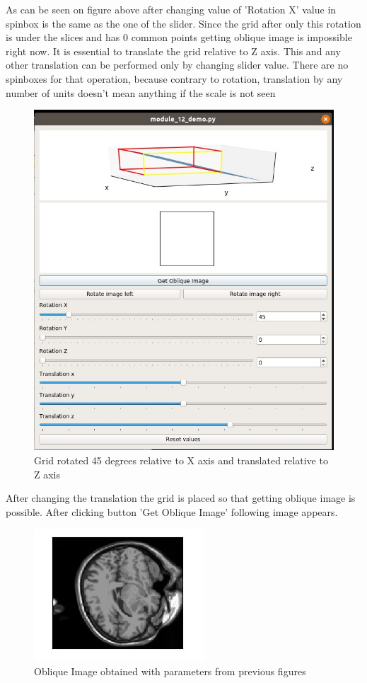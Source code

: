 \indent As can be seen on figure above after changing value of 'Rotation X' value in spinbox is the same as the one of the slider. Since the grid after only this rotation is under the slices and has 0 common points getting oblique image is impossible right now.
\newline\indent It is essential to translate the grid relative to Z axis. This and any other translation can be performed only by changing slider value. There are no spinboxes for that operation, because contrary to rotation, translation by any number of units doesn't mean anything if the scale is not seen

\begin{figure}[H]
\centering{}\includegraphics[scale=0.7]{figures/module_12/mod1245degreestrans}\caption{Grid rotated 45 degrees relative to X axis and translated relative to Z axis\label{fig:figure/module_12/Preprocessing}}
\end{figure}
\indent After changing the translation the grid is placed so that getting oblique image is possible. After clicking button 'Get Oblique Image' following image appears.

\begin{figure}[H]
\centering{}\includegraphics[scale=0.7]{figures/module_12/mod1245obl}\caption{Oblique Image obtained with parameters from previous figures\label{fig:figures/module_12/Preprocessing}}
\end{figure}

